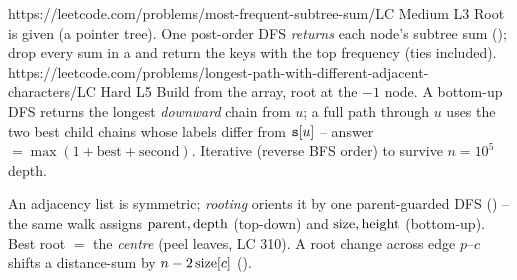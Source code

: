 \begin{practiceset}
    {https://leetcode.com/problems/most-frequent-subtree-sum/}{LC Medium L3}
    {Root is given (a pointer tree). One post-order DFS \emph{returns} each node's subtree sum
    (); drop every sum in a  and return the
    keys with the top frequency (ties included).}
    {https://leetcode.com/problems/longest-path-with-different-adjacent-characters/}{LC Hard L5}
    {Build  from the  array, root at the $-1$ node. A bottom-up
    DFS returns the longest \emph{downward} chain from $u$; a full path through $u$ uses the
    two best child chains whose labels differ from $\texttt{s}[u]$ -- answer $=\max(1{+}\text{best}
    {+}\text{second})$. Iterative (reverse BFS order) to survive $n=10^5$ depth.}
\end{practiceset}

\begin{recallbox}
An adjacency list is symmetric; \emph{rooting} orients it by one parent-guarded DFS
() -- the same walk assigns $\operatorname{parent},\operatorname{depth}$ (top-down) and
$\operatorname{size},\operatorname{height}$ (bottom-up). Best root $=$ the \emph{centre} (peel leaves, LC 310). A root
change across edge $p$--$c$ shifts a distance-sum by $n-2\operatorname{size}[c]$ ().
\end{recallbox}
